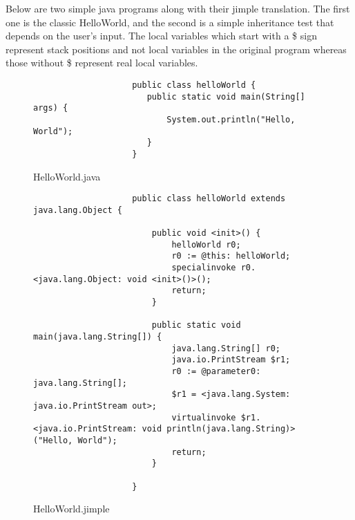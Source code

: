 \documentclass{dithesis}
\begin{document}
        Below are two simple java programs along with their jimple translation. The first one is the classic HelloWorld, and the second is a simple inheritance test that depends on the user's input. 
       	The local variables which start with a \$ sign represent stack positions and not local variables in the original program whereas those without \$ represent real local variables.
            \begin{figure}[H]
                \begin{lstlisting}
                    public class helloWorld {
                       public static void main(String[] args) {
                           System.out.println("Hello, World");
                       }
                    }
                \end{lstlisting}
            \caption{HelloWorld.java}
            \end{figure}
            \begin{figure}[H]
                \begin{lstlisting}
                    public class helloWorld extends java.lang.Object {

                        public void <init>() {
                            helloWorld r0;
                            r0 := @this: helloWorld;
                            specialinvoke r0.<java.lang.Object: void <init>()>();
                            return;
                        }

                        public static void main(java.lang.String[]) {
                            java.lang.String[] r0;
                            java.io.PrintStream $r1;
                            r0 := @parameter0: java.lang.String[];
                            $r1 = <java.lang.System: java.io.PrintStream out>;
                            virtualinvoke $r1.<java.io.PrintStream: void println(java.lang.String)>("Hello, World");
                            return;
                        }

                    }
                \end{lstlisting}
            \caption{HelloWorld.jimple}
            \end{figure}
\end{document}

